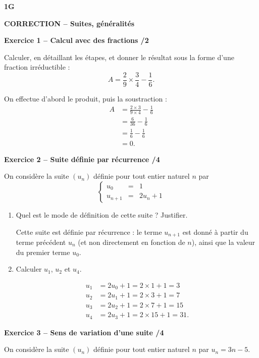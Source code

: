 \documentclass[10pt,a4paper]{article}
\renewcommand{\niveau}{1G}
\renewcommand{\chapitre}{Suites, généralités}
\renewcommand{\interroversion}[1]{
    \noindent\textbf{\niveau}

    \vspace{-0.5cm}
    \begin{center}
        \textbf{\large CORRECTION -- \chapitre}
    \end{center}

    \vspace{0.1cm}
}
\begin{document}

\interroversion{A}

\textbf{Exercice 1 -- Calcul avec des fractions \hfill /2}

Calculer, en détaillant les étapes, et donner le résultat sous la forme d'une fraction irréductible :
\[
A = \frac{2}{9}\times\frac{3}{4}-\frac{1}{6}.
\]

On effectue d'abord le produit, puis la soustraction :
\[
\begin{aligned}
A &= \frac{2\times3}{9\times4}-\frac{1}{6}\\
  &= \frac{6}{36}-\frac{1}{6}\\
  &= \frac{1}{6}-\frac{1}{6}\\
  &= 0.
\end{aligned}
\]

\textbf{Exercice 2 -- Suite définie par récurrence \hfill /4}

On considère la suite \((u_n)\) définie pour tout entier naturel \(n\) par
\[
\left\{\begin{array}{rcl}
u_0 &=& 1 \\
u_{n+1} &=& 2u_n+1
\end{array}\right.
\]

\begin{enumerate}
\item Quel est le mode de définition de cette suite ? Justifier.

Cette suite est définie par récurrence : le terme \(u_{n+1}\) est donné à partir du terme précédent \(u_n\) (et non directement en fonction de \(n\)), ainsi que la valeur du premier terme \(u_0\).

\item Calculer \(u_1\), \(u_2\) et \(u_4\).

\[
\begin{aligned}
u_1 &= 2u_0+1 = 2\times1+1 = 3\\
u_2 &= 2u_1+1 = 2\times3+1 = 7\\
u_3 &= 2u_2+1 = 2\times7+1 = 15\\
u_4 &= 2u_3+1 = 2\times15+1 = 31.
\end{aligned}
\]
\end{enumerate}

\textbf{Exercice 3 -- Sens de variation d'une suite \hfill /4}

On considère la suite \((u_n)\) définie pour tout entier naturel \(n\) par \(u_n=3n-5\).
\end{document}
